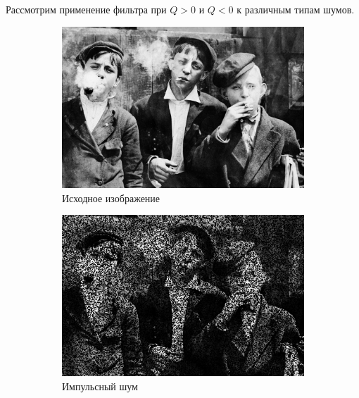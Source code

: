 Рассмотрим применение фильтра при $Q > 0$ и $Q < 0$ к различным типам шумов. 

\begin{figure}[ht] 
    \centering
    \begin{subfigure}[b]{0.5\linewidth}
        \centering
        \includegraphics[width=0.95\linewidth]{../lewis-hine-taschen-main-3.jpg} 
        \caption{Исходное изображение} 
        \label{contraharmonic_-1.85:a} 
        \vspace{4ex}
    \end{subfigure}%
    \begin{subfigure}[b]{0.5\linewidth}
      \centering
      \includegraphics[width=0.95\linewidth]{../Contraharmonic_Filter/Contraharmonic_Impulse_noise_(m,n=(3,_3),q=-1.85).jpg} 
      \caption{Импульсный шум} 
      \label{contraharmonic_-1.85:b} 
      \vspace{4ex}
    \end{subfigure}
    \begin{subfigure}[b]{0.5\linewidth}

\end{subfigure}
\end{figure}
